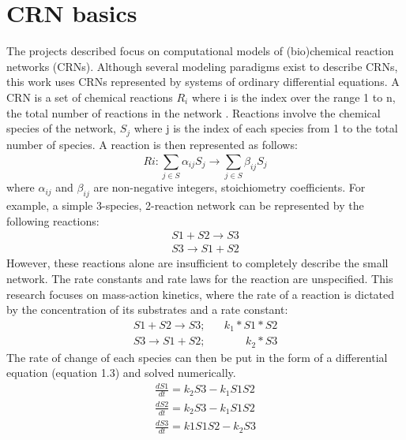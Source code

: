 \documentclass[12pt]{report}
\begin{document}
\section{CRN basics}
The projects described focus on computational models of (bio)chemical reaction networks (CRNs). Although several modeling paradigms exist to describe CRNs, this work uses CRNs represented by systems of ordinary differential equations. A CRN is a set of chemical reactions $R_i$ where i is the index over the range 1 to n, the total number of reactions in the network . Reactions involve the chemical species of the network, $S_j$ where j is the index of each species from 1 to the total number of species. A reaction is then represented as follows:
\begin{equation*}
Ri: \sum_{j\in S}^{}\alpha_{ij}S_j\to \sum_{j\in S}^{}\beta_{ij}S_j
\end{equation*}
where $\alpha_{ij}$ and $\beta_{ij}$ are non-negative integers, stoichiometry coefficients. For example, a simple 3-species, 2-reaction network can be represented by the following reactions:
\begin{equation}
\begin{split}
S1 + S2 \to S3 \\
S3 \to S1 + S2
\end{split}
\end{equation}
However, these reactions alone are insufficient to completely describe the small network. The rate constants and rate laws for the reaction are unspecified. This research focuses on mass-action kinetics, where the rate of a reaction is dictated by the concentration of its substrates and a rate constant:
\begin{equation}
\begin{split}
S1 + S2 \to S3; \;\;\;\;\;\; k_1*S1*S2\\
S3 \to S1 + S2; \;\;\;\;\;\;\;\;\;\;\;\;\; k_2*S3
\end{split}
\end{equation}
The rate of change of each species can then be put in the form of a differential equation (equation 1.3) and solved numerically.
\begin{equation}
\begin{split}
\frac{dS1}{dt}=k_2S3 - k_1S1S2\\
\frac{dS2}{dt}=k_2S3 -k_1S1S2\\
\frac{dS3}{dt}=k1S1S2 - k_2S3
\end{split}
\end{equation}
\end{document}
